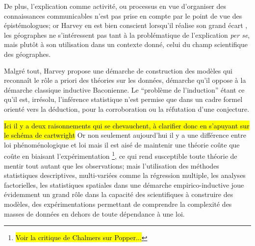 De plus, l'explication comme activité, ou processus en vue d'organiser des connaissances communicables n'est pas prise en compte par le point de vue des épistémologues; or Harvey en est bien conscient lorsqu'il réalise son grand écart \autocite[10]{Harvey1969}, les géographes ne s’intéressent pas tant à la problématique de l'explication \textit{per se}, mais plutôt à son utilisation dans un contexte donné, celui du champ scientifique des géographes.

Malgré tout, Harvey propose une démarche de construction des modèles qui reconnaît le rôle a priori des théories sur les données, démarche qu'il oppose à la démarche classique inductive Baconienne. Le \enquote{problème de l'induction} étant ce qu'il est, irrésolu, l'inférence statistique n'est permise que dans un cadre formel orienté vers la déduction, pour la corroboration ou la réfutation d'une conjecture.

\hl{Ici il y a deux raisonnements qui se chevauchent, à clarifier donc en s'apuyant sur le schéma de cartwright}
Or non seulement aujourd'hui il y a une différence entre loi phénoménologique et loi mais il est aisé de maintenir une théorie coûte que coûte en biaisant l'expérimentation \footnote{\hl{Voir la critique de Chalmers sur Popper...} }, ce qui rend susceptible toute théorie de mentir tout autant que les observations; mais l'utilisation des méthodes statistiques descriptives, multi-variées comme la régression multiple, les analyses factorielles, les statistiques spatiales dans une démarche empirico-inductive joue évidemment un grand rôle dans la capacité des scientifiques à construire des modèles, des expérimentations permettant de comprendre la complexité des masses de données en dehors de toute dépendance à une loi. %


